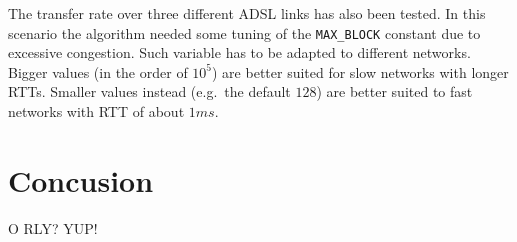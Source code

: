 \documentclass[10pt,onecolumn]{article}
\begin{document}
The transfer rate over three different ADSL links has also been tested. In
this scenario the algorithm needed some tuning of the \texttt{MAX\_BLOCK}
constant due to excessive congestion. Such variable has to be adapted to
different networks. Bigger values (in the order of $10^5$) are better suited
for slow networks with longer RTTs. Smaller values instead (e.g.\ the default
$128$) are better suited to fast networks with RTT of about $1ms$.

\section{Concusion}
O RLY? YUP!
\end{document}
